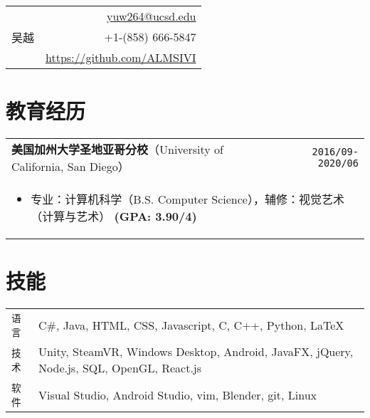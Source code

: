 \documentclass[UTF8]{ctexart}
\newcommand{\itemcols}[1]{
	\multicolumn{2}{p{\dimexpr \linewidth-2\tabcolsep}}{
		\begin{itemize}
			#1
		\end{itemize}
	}
}
\begin{document}
	\noindent
	\begin{tabularx}{\linewidth}{X r}
		\multirow{3}{*}{{\fontsize{40}{50}\selectfont 吴越}}
		& \href{mailto:yuw264@ucsd.edu}{yuw264@ucsd.edu} \\
		& +1-(858) 666-5847 \\
		& \href{https://github.com/ALMSIVI}{https://github.com/ALMSIVI}
	\end{tabularx}
	
	
	\begin{comment}
	\noindent
	\end{comment}
	
	\begin{comment}
	\begin{tabularx}{\linewidth}{X r}
	\multirow{5}{*}{{\fontsize{45}{60}\selectfont 吴越}} 
	& \href{mailto:yuw264@ucsd.edu}{yuw264@ucsd.edu} \\
	& +1-(858) 666-5847 \\
	& 8840 Costa Verde Blvd. Apt. 3322 \\
	& San Diego, CA 92122
	& United States
	\end{tabularx}
	\end{comment}
	
	
	\section{教育经历}
	\smallskip
	\noindent
	\begin{tabularx}{\linewidth}{X r}
		\textbf{\large 美国加州大学圣地亚哥分校}（University of California, San Diego） & \texttt{2016/09-2020/06} \\
		\itemcols {
			\item 专业：计算机科学（B.S. Computer Science），辅修：视觉艺术（计算与艺术） \textbf{(GPA: 3.90/4)
		}
	}
	\end{tabularx}
	
	
	\section{技能}
	\smallskip
	\noindent
	\begin{tabularx}{\linewidth}{l X}
		\texttt{语言} & C\#, Java, HTML, CSS, Javascript, C, C++, Python, \LaTeX \\
		\texttt{技术} & Unity, SteamVR, Windows Desktop, Android, JavaFX, jQuery, Node.js, SQL, OpenGL, React.js \\
		\texttt{软件} & Visual Studio, Android Studio, vim, Blender, git, Linux
	\end{tabularx}
\end{document}
